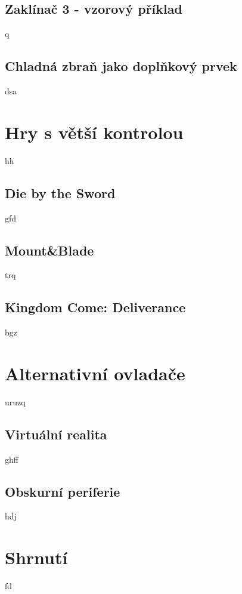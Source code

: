 \subsection{Zaklínač 3 - vzorový příklad}
q

\subsection{Chladná zbraň jako doplňkový prvek}
dsa



\section{Hry s větší kontrolou}
hh

\subsection{Die by the Sword}
gfd

\subsection{Mount\&Blade}
trq

\subsection{Kingdom Come: Deliverance}
bgz


\section{Alternativní ovladače}
uruzq

\subsection{Virtuální realita}
ghff

\subsection{Obskurní periferie}
hdj


\section{Shrnutí}
fd
